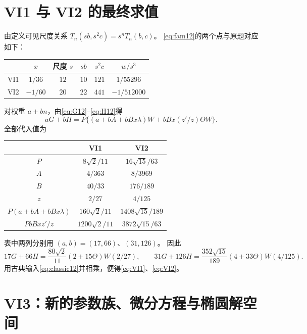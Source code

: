 \documentclass[11pt,a4paper]{article}
\numberwithin{equation}{section}
\theoremstyle{remark}\newtheorem{remark}[theorem]{说明}
\begin{document}
\section{VI1 与 VI2 的最终求值}
由定义可见尺度关系 $T_n(sb,s^2c)=s^nT_n(b,c)$。
\eqref{eq:fam12}的两个点与原题对应如下：
\begin{center}\begin{tabular}{c c c c c c}\toprule
 & $x$ & 尺度 $s$ & $sb$ & $s^2c$ & $w/s^3$\\\midrule
 VI1 & $1/36$ & $12$ & $10$ & $121$ & $1/55296$\\
 VI2 & $-1/60$ & $20$ & $22$ & $441$ & $-1/512000$\\\bottomrule
\end{tabular}\end{center}
对权重 $a+bn$，由\eqref{eq:G12}--\eqref{eq:H12}得
\begin{equation}\label{eq:weight12}
 aG+bH=P\{(a+bA+bBx\lambda)W+bBx(z'/z)\Theta W\}.
\end{equation}
全部代入值为
\begin{center}\small\begin{tabular}{c c c}\toprule
 & VI1 & VI2\\\midrule
 $P$ & $8\sqrt2/11$ & $16\sqrt{15}/63$\\
 $A$ & $4/363$ & $8/3969$\\
 $B$ & $40/33$ & $176/189$\\
 $z$ & $2/27$ & $4/125$\\
 $P(a+bA+bBx\lambda)$ & $160\sqrt2/11$ & $1408\sqrt{15}/189$\\
 $PbBxz'/z$ & $1200\sqrt2/11$ & $3872\sqrt{15}/63$\\\bottomrule
\end{tabular}\end{center}
表中两列分别用 $(a,b)=(17,66)$、$(31,126)$。
因此
\[
 17G+66H=\frac{80\sqrt2}{11}(2+15\Theta)W(2/27),\qquad
 31G+126H=\frac{352\sqrt{15}}{189}(4+33\Theta)W(4/125).
\]
用古典输入\eqref{eq:classic12}并相乘，便得\eqref{eq:VI1}、\eqref{eq:VI2}。

\section{VI3：新的参数族、微分方程与椭圆解空间}
\end{document}
